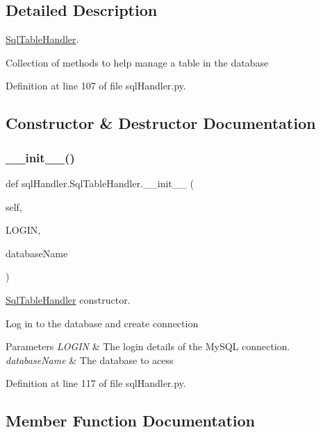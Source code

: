 \subsection{Detailed Description}
\mbox{\hyperlink{classsql_handler_1_1_sql_table_handler}{Sql\+Table\+Handler}}. 

Collection of methods to help manage a table in the database 

Definition at line 107 of file sql\+Handler.\+py.



\subsection{Constructor \& Destructor Documentation}
\mbox{\label{classsql_handler_1_1_sql_table_handler_a3eba23f872710ef3a21c172a9469a449}} 
\subsubsection{\texorpdfstring{\_\_init\_\_()}{\_\_init\_\_()}}
{\footnotesize\ttfamily def sql\+Handler.\+Sql\+Table\+Handler.\+\_\+\+\_\+init\+\_\+\+\_\+ (\begin{DoxyParamCaption}\item[{}]{self,  }\item[{}]{L\+O\+G\+IN,  }\item[{}]{database\+Name }\end{DoxyParamCaption})}



\mbox{\hyperlink{classsql_handler_1_1_sql_table_handler}{Sql\+Table\+Handler}} constructor. 

Log in to the database and create connection 
\begin{DoxyParams}{Parameters}
{\em L\+O\+G\+IN} & The login details of the My\+S\+QL connection. \\
\hline
{\em database\+Name} & The database to acess \\
\hline
\end{DoxyParams}


Definition at line 117 of file sql\+Handler.\+py.



\subsection{Member Function Documentation}
\mbox{\label{classsql_handler_1_1_sql_table_handler_a0b726791958aa4a469f4ec8b37f8d53b}} 
